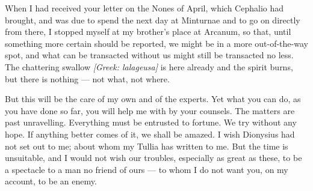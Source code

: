

 When I had received your letter on the Nones of April, which Cephalio had brought, and was due to spend the next day at Minturnae and to go on directly from there, I stopped myself at my brother's place at Arcanum, so that, until something more certain should be reported, we might be in a more out-of-the-way spot, and what can be transacted without us might still be transacted no less. The chattering swallow \textit{[Greek: lalageusa]} is here already and the spirit burns, but there is nothing --- not what, not where.

 But this will be the care of my own and of the experts. Yet what you can do, as you have done so far, you will help me with by your counsels. The matters are past unravelling. Everything must be entrusted to fortune. We try without any hope. If anything better comes of it, we shall be amazed. I wish Dionysius had not set out to me; about whom my Tullia has written to me. But the time is unsuitable, and I would not wish our troubles, especially as great as these, to be a spectacle to a man no friend of ours --- to whom I do not want you, on my account, to be an enemy.
